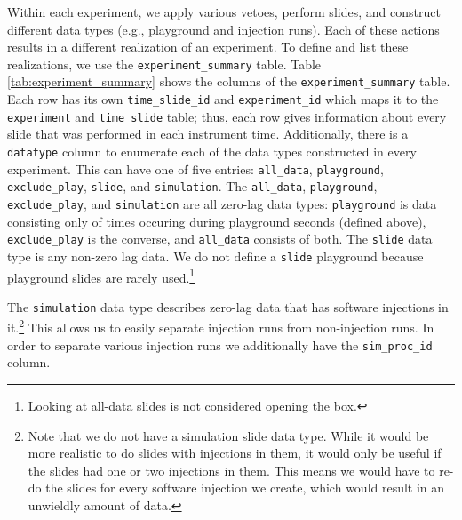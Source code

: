 Within each experiment, we apply various vetoes, perform slides, and construct different data types (e.g., playground and injection runs). Each of these actions results in a different realization of an experiment. To define and list these realizations, we use the \texttt{experiment\_summary} table. Table \ref{tab:experiment_summary} shows the columns of the \texttt{experiment\_summary} table. Each row has its own \texttt{time\_slide\_id} and \texttt{experiment\_id} which maps it to the \texttt{experiment} and \texttt{time\_slide} table; thus, each row gives information about every slide that was performed in each instrument time. Additionally, there is a \texttt{datatype} column to enumerate each of the data types constructed in every experiment. This can have one of five entries: \texttt{all\_data}, \texttt{playground}, \texttt{exclude\_play}, \texttt{slide}, and \texttt{simulation}. The \texttt{all\_data}, \texttt{playground}, \texttt{exclude\_play}, and \texttt{simulation} are all zero-lag data types: \texttt{playground} is data consisting only of times occuring during playground seconds (defined above), \texttt{exclude\_play} is the converse, and \texttt{all\_data} consists of both. The \texttt{slide} data type is any non-zero lag data. We do not define a \texttt{slide} playground because playground slides are rarely used.\footnote{Looking at all-data slides is not considered opening the box.}

The \texttt{simulation} data type describes zero-lag data that has software injections in it.\footnote{Note that we do not have a simulation slide data type. While it would be more realistic to do slides with injections in them, it would only be useful if the slides had one or two injections in them. This means we would have to re-do the slides for every software injection we create, which would result in an unwieldly amount of data.} This allows us to easily separate injection runs from non-injection runs. In order to separate various injection runs we additionally have the \texttt{sim\_proc\_id} column.

